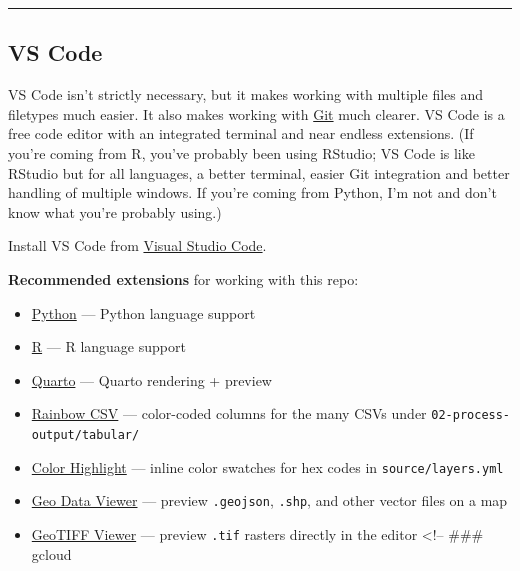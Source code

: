 \documentclass[
  letterpaper,
  DIV=11,
  numbers=noendperiod]{scrreprt}
\providecommand{\tightlist}{%
  \setlength{\itemsep}{0pt}\setlength{\parskip}{0pt}}
\begin{document}
\begin{center}\rule{0.5\linewidth}{0.5pt}\end{center}

\subsection{VS Code}\label{vs-code}

VS Code isn't strictly necessary, but it makes working with multiple
files and filetypes much easier. It also makes working with
\hyperref[git]{Git} much clearer. VS Code is a free code editor with an
integrated terminal and near endless extensions. (If you're coming from
R, you've probably been using RStudio; VS Code is like RStudio but for
all languages, a better terminal, easier Git integration and better
handling of multiple windows. If you're coming from Python, I'm not and
don't know what you're probably using.)

Install VS Code from
\href{https://code.visualstudio.com/Download}{Visual Studio Code}.

\textbf{Recommended extensions} for working with this repo:

\begin{itemize}
\tightlist
\item
  \href{https://marketplace.visualstudio.com/items?itemName=ms-python.python}{Python}
  --- Python language support
\item
  \href{https://marketplace.visualstudio.com/items?itemName=REditorSupport.r}{R}
  --- R language support
\item
  \href{https://marketplace.visualstudio.com/items?itemName=quarto.quarto}{Quarto}
  --- Quarto rendering + preview
\item
  \href{https://marketplace.visualstudio.com/items?itemName=mechatroner.rainbow-csv}{Rainbow
  CSV} --- color-coded columns for the many CSVs under
  \texttt{02-process-output/tabular/}
\item
  \href{https://marketplace.visualstudio.com/items?itemName=naumovs.color-highlight}{Color
  Highlight} --- inline color swatches for hex codes in
  \texttt{source/layers.yml}
\item
  \href{https://marketplace.visualstudio.com/items?itemName=RandomFractalsInc.geo-data-viewer}{Geo
  Data Viewer} --- preview \texttt{.geojson}, \texttt{.shp}, and other
  vector files on a map
\item
  \href{https://marketplace.visualstudio.com/items?itemName=omar2535.geotiff-viewer}{GeoTIFF
  Viewer} --- preview \texttt{.tif} rasters directly in the editor
  \textless!-- \#\#\# gcloud
\end{itemize}
\end{document}
